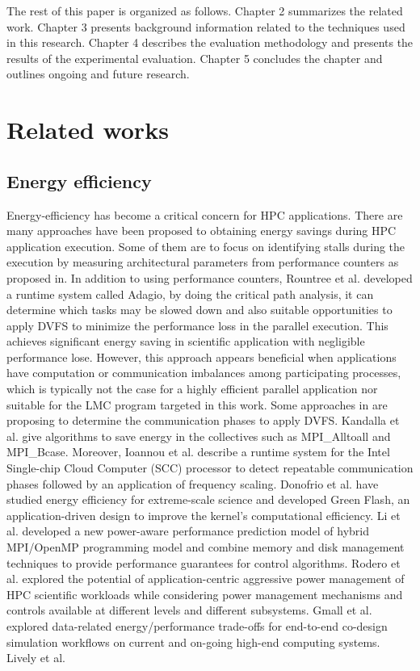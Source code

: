 \documentclass[10pt, conference, compsocconf]{IEEEtran}
\begin{document}
The rest of this paper is organized as follows. Chapter 2 summarizes the related work. Chapter 3 presents background information related to the techniques used in this research. Chapter 4 describes the evaluation methodology and presents the results of the experimental evaluation. Chapter 5 concludes the chapter and outlines ongoing and future research.



\section{Related works}
\subsection{Energy efficiency}
Energy-efficiency has become a critical concern for HPC applications. There are many approaches have been proposed to obtaining energy savings during HPC application execution. Some of them are to focus on identifying stalls during the execution by measuring architectural parameters from performance counters as proposed in\cite{ge2007cpu,hsu2005power,huang2009energy}. In addition to using performance counters, Rountree et al.\cite{rountree2009adagio} developed a runtime system called Adagio, by doing the critical path analysis, it can determine which tasks may be slowed down and also suitable opportunities to apply DVFS to minimize the performance loss in the parallel execution. This achieves significant energy saving in scientific application with negligible performance lose. However, this approach appears beneficial when applications have computation or communication imbalances among participating processes, which is typically not the case for a highly efficient parallel application nor suitable for the LMC program targeted in this work. Some approaches in\cite{freeh2005using,lim2006adaptive} are proposing to determine the communication phases to apply DVFS. Kandalla et al.\cite{kandalla2010designing} give algorithms to save energy in the collectives such as MPI\_Alltoall and MPI\_Bcase. Moreover, Ioannou et al.\cite{ioannou2011phase} describe a runtime system for the Intel Single-chip Cloud Computer (SCC) processor to detect repeatable communication phases followed by an application of frequency scaling. Donofrio et al.\cite{donofrio2009energy} have studied energy efficiency for extreme-scale science and developed Green Flash, an application-driven design to improve the kernel’s computational efficiency. Li et al.\cite{li2010hybrid} developed a new power-aware performance prediction model of hybrid MPI/OpenMP programming model and combine memory and disk management techniques to provide performance guarantees for control algorithms. Rodero et al.\cite{rodero2010investigating} explored the potential of application-centric aggressive power management of HPC scientific workloads while considering power management mechanisms and controls available at different levels and different subsystems. Gmall et al.\cite{gamell2013exploring} explored data-related energy/performance trade-offs for end-to-end co-design simulation workflows on current and on-going high-end computing systems. Lively et al.\cite{lively2011energy} 
\end{document}

